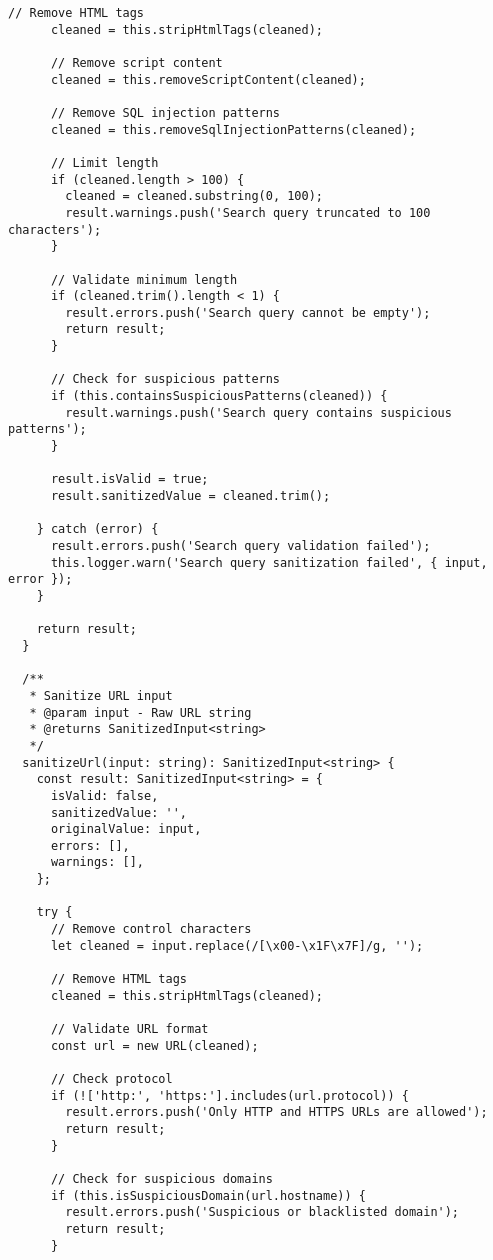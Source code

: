\documentclass[11pt,a4paper]{article}
\begin{document}
\begin{lstlisting}[style=typescript, caption=Comprehensive Input Sanitization]
      // Remove HTML tags
      cleaned = this.stripHtmlTags(cleaned);
      
      // Remove script content
      cleaned = this.removeScriptContent(cleaned);
      
      // Remove SQL injection patterns
      cleaned = this.removeSqlInjectionPatterns(cleaned);
      
      // Limit length
      if (cleaned.length > 100) {
        cleaned = cleaned.substring(0, 100);
        result.warnings.push('Search query truncated to 100 characters');
      }

      // Validate minimum length
      if (cleaned.trim().length < 1) {
        result.errors.push('Search query cannot be empty');
        return result;
      }

      // Check for suspicious patterns
      if (this.containsSuspiciousPatterns(cleaned)) {
        result.warnings.push('Search query contains suspicious patterns');
      }

      result.isValid = true;
      result.sanitizedValue = cleaned.trim();

    } catch (error) {
      result.errors.push('Search query validation failed');
      this.logger.warn('Search query sanitization failed', { input, error });
    }

    return result;
  }

  /**
   * Sanitize URL input
   * @param input - Raw URL string
   * @returns SanitizedInput<string>
   */
  sanitizeUrl(input: string): SanitizedInput<string> {
    const result: SanitizedInput<string> = {
      isValid: false,
      sanitizedValue: '',
      originalValue: input,
      errors: [],
      warnings: [],
    };

    try {
      // Remove control characters
      let cleaned = input.replace(/[\x00-\x1F\x7F]/g, '');
      
      // Remove HTML tags
      cleaned = this.stripHtmlTags(cleaned);
      
      // Validate URL format
      const url = new URL(cleaned);
      
      // Check protocol
      if (!['http:', 'https:'].includes(url.protocol)) {
        result.errors.push('Only HTTP and HTTPS URLs are allowed');
        return result;
      }

      // Check for suspicious domains
      if (this.isSuspiciousDomain(url.hostname)) {
        result.errors.push('Suspicious or blacklisted domain');
        return result;
      }


\end{lstlisting}
\end{document}
